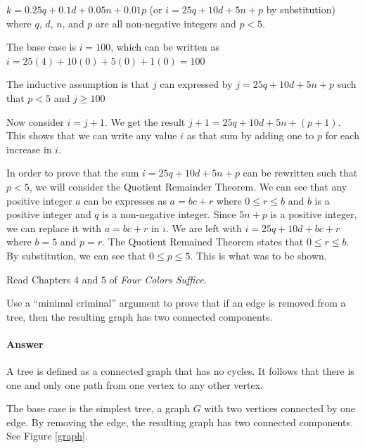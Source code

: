 \documentclass{article}
\begin{document}
$k = 0.25q + 0.1d + 0.05n + 0.01p$ (or $i = 25q + 10d + 5n + p$ by substitution)
where $q$, $d$, $n$, and $p$ are all non-negative integers and $p<5$.

The base case is $i = 100$, which can be written as $i = 25(4) + 10(0) + 5(0) + 1(0) = 100$

The inductive assumption is that $j$ can expressed by $j = 25q + 10d + 5n + p$ such that $p<5$ and $j \geq 100$

Now consider $i=j+1$. We get the result $j+1 = 25q + 10d +5n + (p+1)$. This shows that we can write any value 
$i$ as that sum by adding one to $p$ for each increase in $i$.

In order to prove that the sum $i = 25q + 10d + 5n + p$ can be rewritten such that $p<5$, we will consider the Quotient Remainder Theorem.
We can see that any positive integer $a$ can be expresses as $a = bc + r$ where $0 \leq r \leq b$ and $b$ is a positive integer and $q$ is a non-negative integer.
Since $5n+p$ is a positive integer, we can replace it with $a=bc+r$ in $i$. We are left with  $i = 25q + 10d + bc+r$ where $b=5$ and $p=r$. 
The Quotient Remained Theorem states that $0 \leq r \leq b$. By substitution, we can see that $0 \leq p \leq 5$. This is what was to be shown.



 

Read Chapters $4$ and $5$ of \emph{Four Colors Suffice}.

Use a ``minimal criminal'' argument to prove that if an edge is removed from a
tree, then the resulting graph has two connected components.

        \paragraph{Answer}

	A tree is defined as a connected graph that has no cycles. It follows that there is one and only one path from one vertex to any other vertex.
	
	The base case is the simplest tree, a graph $G$ with two vertices connected by one edge. By removing the edge, the resulting graph has two connected components. See Figure \ref{graph}.
	
\end{document}
